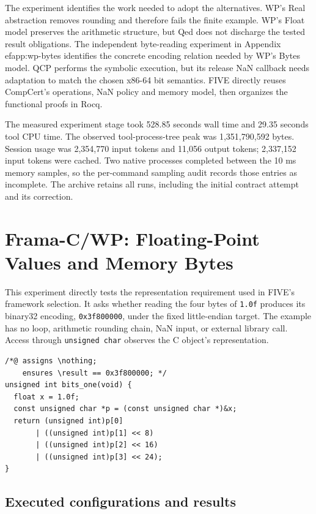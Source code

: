\documentclass[manuscript, screen, review]{acmart}
\begin{document}
The experiment identifies the work needed to adopt the alternatives.
WP's Real abstraction removes rounding and therefore fails the finite
example. WP's Float model preserves the arithmetic structure, but Qed
does not discharge the tested result obligations. The independent byte-reading experiment in
Appendix~
ef{app:wp-bytes} identifies the concrete encoding relation
needed by WP's Bytes model. QCP performs the symbolic execution,
but its release NaN callback needs adaptation to match the chosen x86-64
bit semantics. FIVE directly reuses CompCert's operations, NaN policy and
memory model, then organizes the functional proofs in Rocq.

The measured experiment stage took 528.85 seconds wall time and 29.35
seconds tool CPU time. The observed tool-process-tree peak was
1,351,790,592 bytes. Session usage was 2,354,770 input tokens and 11,056
output tokens; 2,337,152 input tokens were cached. Two native processes
completed between the 10 ms memory samples, so the per-command sampling
audit records those entries as incomplete. The archive retains all runs,
including the initial contract attempt and its correction.


\clearpage
\section{Frama-C/WP: Floating-Point Values and Memory Bytes}
\label{app:wp-bytes}

This experiment directly tests the representation requirement used in
FIVE's framework selection. It asks whether reading the four bytes of
\texttt{1.0f} produces its binary32 encoding, \texttt{0x3f800000}, under
the fixed little-endian target. The example has no loop, arithmetic
rounding chain, NaN input, or external library call. Access through
\texttt{unsigned char} observes the C object's representation.

\begin{verbatim}
/*@ assigns \nothing;
    ensures \result == 0x3f800000; */
unsigned int bits_one(void) {
  float x = 1.0f;
  const unsigned char *p = (const unsigned char *)&x;
  return (unsigned int)p[0]
       | ((unsigned int)p[1] << 8)
       | ((unsigned int)p[2] << 16)
       | ((unsigned int)p[3] << 24);
}
\end{verbatim}

\subsection{Executed configurations and results}
\end{document}

